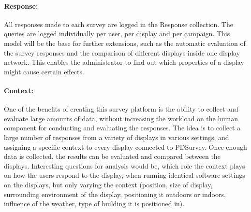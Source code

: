 	\paragraph{Response:} All responses made to each survey are logged in the Response collection. The queries are logged individually per user, per display and per campaign. This model will be the base for further extensions, such as the automatic evaluation of the survey responses and the comparison of different displays inside one display network. This enables the administrator to find out which properties of a display might cause certain effects.

	\paragraph{Context:} One of the benefits of creating this survey platform is the ability to collect and evaluate large amounts of data, without increasing the workload on the human component for conducting and evaluating the responses. The idea is to collect a large number of responses from a variety of displays in various settings, and assigning a specific context to every display connected to PDSurvey. Once enough data is collected, the results can be evaluated and compared between the displays. Interesting questions for analysis would be, which role the context plays on how the users respond to the display, when running identical software settings on the displays, but only varying the context (position, size of display, surrounding environment of the display, positioning it outdoors or indoors, influence of the weather, type of building it is positioned in).




